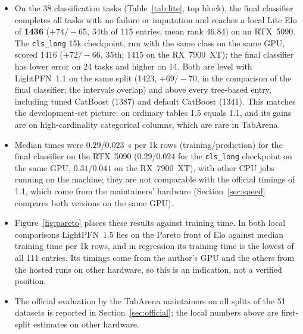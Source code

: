 \documentclass[11pt]{article}
\begin{document}
\begin{itemize}
\item On the 38 classification tasks (Table~\ref{tab:lite}, top block), the final classifier completes all tasks with no failure or imputation and reaches a local Lite Elo of \textbf{1436} ($+74/-65$, 34th of 115 entries, mean rank 46.84) on an RTX~5090. The \texttt{cls\_long} 15k checkpoint, run with the same class on the same GPU, scored 1416 ($+72/-66$, 35th; 1415 on the RX~7900~XT); the final classifier has lower error on 24 tasks and higher on 14. Both are level with LightPFN~1.1 on the same split (1423, $+69/-70$, in the comparison of the final classifier; the intervals overlap) and above every tree-based entry, including tuned CatBoost (1387) and default CatBoost (1341). This matches the development-set picture: on ordinary tables 1.5 equals 1.1, and its gains are on high-cardinality categorical columns, which are rare in TabArena. %
\item Median times were $0.29$/$0.023$~s per 1k rows (training/prediction) for the final classifier on the RTX~5090 ($0.29$/$0.024$ for the \texttt{cls\_long} checkpoint on the same GPU, $0.31$/$0.041$ on the RX~7900~XT), with other CPU jobs running on the machine; they are not comparable with the official timings of 1.1, which come from the maintainers' hardware (Section~\ref{sec:speed} compares both versions on the same GPU). %
\item Figure~\ref{fig:pareto} places these results against training time. In both local comparisons LightPFN~1.5 lies on the Pareto front of Elo against median training time per 1k rows, and in regression its training time is the lowest of all 111 entries. Its timings come from the author's GPU and the others from the hosted runs on other hardware, so this is an indication, not a verified position.
\item The official evaluation by the TabArena maintainers on all splits of the 51 datasets is reported in Section~\ref{sec:official}; the local numbers above are first-split estimates on other hardware.
\end{itemize}

\begin{table}[tbp]
\centering
\footnotesize
\setlength{\tabcolsep}{3.5pt}
\resizebox{\linewidth}{!}{}
\caption{Author-run TabArena-Lite evaluation of LightPFN~1.5 with the official pipeline and the updated LightPFN model class (first split of each dataset; AMD RX~7900~XT except the final classifier, run on an RTX~5090; compared with the hosted results of the other entries in \texttt{TabArenaContext}; \textbf{not} the official maintainers' leaderboard). Top: 38 classification datasets (115 entries). Bottom: 13 regression datasets (111 entries). Positions count every entry in the local comparison. $^{\ast}$The \texttt{cls\_long} 15k checkpoint, run with the same class on the same RTX~5090 in a separate comparison.}
\label{tab:lite}
\end{table}
\end{document}
